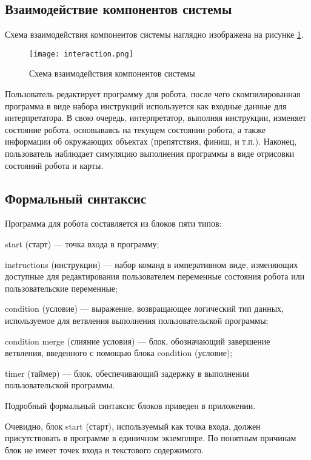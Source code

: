 \subsection{Взаимодействие компонентов системы}

Схема взаимодействия компонентов системы наглядно изображена на рисунке \ref{fig:interaction}.

\begin{figure}[htbp]
	\centering
	\texttt{[image: interaction.png]}
	\caption{Схема взаимодействия компонентов системы}%
	\label{fig:interaction}
\end{figure}

Пользователь редактирует программу для робота, после чего скомпилированная программа в виде набора инструкций используется как входные данные для интерпретатора. В свою очередь, интерпретатор, выполняя инструкции, изменяет состояние робота, основываясь на текущем состоянии робота, а также информации об окружающих объектах (препятствия, финиш, и т.п.). Наконец, пользователь наблюдает симуляцию выполнения программы в виде отрисовки состояний робота и карты. 

\subsection{Формальный синтаксис}
Программа для робота составляется из блоков пяти типов:
\begin{itemize*}
	\item start (старт) — точка входа в программу;
	\item instructions (инструкции) — набор команд в императивном виде, изменяющих доступные для редактирования пользователем переменные состояния робота или пользовательские переменные;
	\item condition (условие) — выражение, возвращающее логический тип данных, используемое для ветвления выполнения пользовательской программы;
	\item condition merge (слияние условия) — блок, обозначающий завершение ветвления, введенного с помощью блока condition (условие);
	\item timer (таймер) — блок, обеспечивающий задержку в выполнении пользовательской программы.
\end{itemize*}

Подробный формальный синтаксис блоков приведен в приложении.

Очевидно, блок start (старт), используемый как точка входа, должен присутствовать в программе в единичном экземпляре. По понятным причинам блок не имеет точек входа и текстового содержимого.

